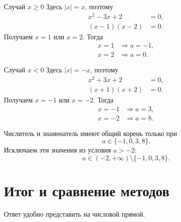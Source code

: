 \begin{minipage}[t]{0.485\textwidth}
  \begin{casebox}{Случай \(x\ge 0\)}
    Здесь \(|x|=x\), поэтому
    \[
      \begin{aligned}
        x^2-3x+2&=0,\\
        (x-1)(x-2)&=0.
      \end{aligned}
    \]
    Получаем \(x=1\) или \(x=2\). Тогда
    \[
      \begin{aligned}
        x=1&\Rightarrow a=-1,\\
        x=2&\Rightarrow a=0.
      \end{aligned}
    \]
  \end{casebox}
\end{minipage}\hfill
\begin{minipage}[t]{0.485\textwidth}
  \begin{casebox}{Случай \(x<0\)}
    Здесь \(|x|=-x\), поэтому
    \[
      \begin{aligned}
        x^2+3x+2&=0,\\
        (x+1)(x+2)&=0.
      \end{aligned}
    \]
    Получаем \(x=-1\) или \(x=-2\). Тогда
    \[
      \begin{aligned}
        x=-1&\Rightarrow a=3,\\
        x=-2&\Rightarrow a=8.
      \end{aligned}
    \]
  \end{casebox}
\end{minipage}

\begin{conclusionbox}
  Числитель и знаменатель имеют общий корень только при
  \[
    a\in\{-1,0,3,8\}.
  \]
  Исключаем эти значения из условия \(a>-2\):
  \[
    \boxed{a\in(-2,+\infty)\setminus\{-1,0,3,8\}}.
  \]
\end{conclusionbox}

\section{Итог и сравнение методов}

Ответ удобно представить на числовой прямой.

\parameternumberlinefigure

